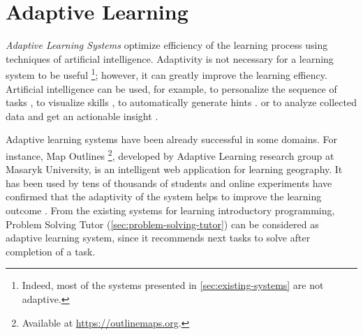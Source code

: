 \chapter{Adaptive Learning}
\label{chap:adaptive-learning}


\emph{Adaptive Learning Systems}
optimize efficiency of the learning process
using techniques of artificial intelligence.
Adaptivity is not necessary for a learning system to be useful%
\footnote{Indeed, most of the systems presented in \cref{sec:existing-systems} are not adaptive.};
however, it can greatly improve the learning effiency.
Artificial intelligence can be used, for example, to
personalize the sequence of tasks \cite{proso}, %
to visualize skills \cite{open-learner-model},
to automatically generate hints \cite{generating-hints}. %
or to analyze collected data and get an actionable insight \cite{alg.mastery}.


Adaptive learning systems have been already successful in some domains.
For instance, Map Outlines%
  \footnote{Available at \url{https://outlinemaps.org}.},
  developed by Adaptive Learning research group at Masaryk University,
  is an intelligent web application for learning geography.
It has been used by tens of thousands of students and
  online experiments have confirmed
  that the adaptivity of the system helps to improve the learning outcome
  \cite{alg.evaluation-geography}.
From the existing systems for learning introductory programming,
Problem Solving Tutor (\cref{sec:problem-solving-tutor}) can be considered
as adaptive learning system, since it recommends next tasks to solve after completion of a task.

